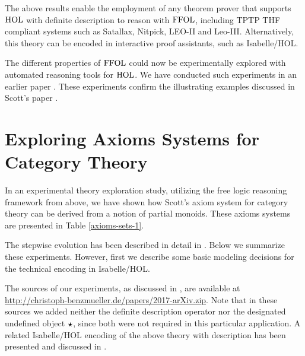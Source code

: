 


The above results enable the employment of any theorem prover that
supports $\text{\textrm{HOL}}$ with definite description to reason with $\text{\textrm{FFOL}}$,
including TPTP THF \cite{J22} compliant systems such as Satallax,
Nitpick, LEO-II and Leo-III. Alternatively, this theory can be encoded
in interactive proof assistants, such as Isabelle/HOL. 

The different properties of $\text{\textrm{FFOL}}$ could now be experimentally explored with
automated reasoning tools for $\text{\textrm{HOL}}$. We have conducted such
experiments in 
an earlier paper \cite{ICMS}. These experiments confirm the
illustrating examples discussed in Scott's paper \cite{Scott67}.


\section{Exploring Axioms Systems for Category Theory}
In an experimental theory exploration study, utilizing the
free logic reasoning framework from above, 
we have shown how Scott's
\cite{Scott79} axiom system for category theory can be derived from a
notion of partial monoids. These axioms systems are presented in Table \ref{axioms-sets-1}.

The stepwise evolution has been described in detail in
\cite{ArXiv}. Below we summarize these experiments.  However, first we
describe some basic modeling decisions for the technical encoding in
Isabelle/HOL. 

The sources of our experiments, as discussed in
\cite{ArXiv}, are available at
\url{http://christoph-benzmueller.de/papers/2017-arXiv.zip}. Note that
in these sources we added neither the definite description operator
nor the designated undefined object $\boldsymbol{\star}$, since both were not
required in this particular application. A related Isabelle/HOL
encoding of the above theory with description has been presented and
discussed in \cite{ICMS}.

